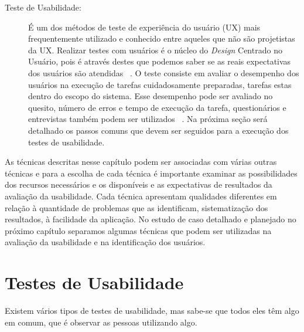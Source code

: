 \begin{description}
\item[Teste de Usabilidade:]

É um dos métodos de teste de experiência do usuário (UX) mais frequentemente utilizado e conhecido entre aqueles que não são projetistas da UX. Realizar testes com usuários é o núcleo do \emph{Design} Centrado no Usuário, pois é através destes que podemos saber se as reais expectativas dos usuários são atendidas ~\cite{santos2012}.
%
O teste consiste em avaliar o desempenho dos usuários na execução de tarefas cuidadosamente preparadas, tarefas estas dentro do escopo do sistema. Esse desempenho pode ser avaliado no quesito, número de erros e tempo de execução da tarefa, questionários e entrevistas também podem ser utilizados ~\cite{preece2007}. Na próxima seção será detalhado os passos comuns que devem ser seguidos para a execução dos testes de usabilidade.


\end{description}

	As técnicas descritas nesse capítulo podem ser associadas com várias outras técnicas e para a escolha de cada técnica é importante examinar as possibilidades dos recursos necessários e os disponíveis e as expectativas de resultados da avaliação da usabilidade. Cada técnica apresentam qualidades diferentes em relação à quantidade de problemas que as identificam, sistematização dos resultados, à facilidade da aplicação. 
%
No estudo de caso detalhado e planejado no próximo capítulo separamos algumas técnicas que podem ser utilizadas na avaliação da usabilidade e na identificação dos usuários. 

\section{Testes de Usabilidade}

	Existem vários tipos de testes de usabilidade, mas sabe-se que todos eles têm algo em comum, que é observar as pessoas utilizando algo.

